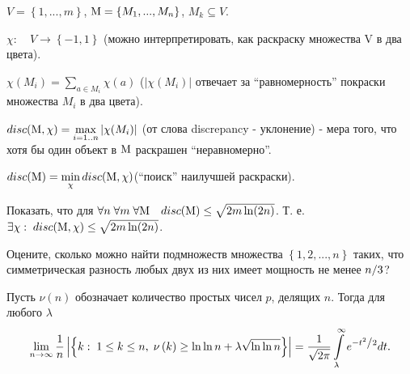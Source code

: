 \begin{problem}
$V=\left\{ {1,...,m} \right\}$, ${\rm M}=\left\{ {M_1 
,...,M_n } \right\}$, $M_k \subseteq V$.

$\chi :\quad V\to \left\{ {-1,1} \right\}$ (можно интерпретировать, как 
раскраску множества V в два цвета).

$\chi (M_i )=\sum\limits_{a\in M_i } {\chi (a)} $ ($\left| {\chi (M_i )} 
\right|$ отвечает за ``равномерность'' покраски множества $M_i $ в два 
цвета).

$disc({\rm M},\chi )=\mathop {\max }\limits_{i=1..n} \left| {\chi (M_i )} 
\right|$ (от слова discrepancy - уклонение) - мера того, что хотя бы один 
объект в ${\rm M}$ раскрашен ``неравномерно''.

$disc({\rm M})=\mathop {\min }\limits_\chi disc({\rm M},\chi )$(``поиск'' 
наилучшей раскраски).

Показать, что для $\forall n\;\forall m\;\forall {\rm M} \quad disc({\rm M})\le 
\sqrt {2m\ln (2n)} $. Т. е. $\exists \chi :\;disc({\rm M},\chi )\le \sqrt 
{2m\ln (2n)} $.

\end{problem}


\begin{problem}
Оцените, сколько можно найти подмножеств множества 
$\left\{ {1,2,...,n} \right\}$ таких, что симметрическая разность любых двух 
из них имеет мощность не менее $n \mathord{\left/ {\vphantom {n 3}} \right. 
\kern-\nulldelimiterspace} 3$?
\end{problem}



\begin{problem}
Пусть $\nu \left( n \right)$ 
обозначает количество простых чисел $p$, делящих $n$. Тогда для любого 
$\lambda $
\[
\mathop {\lim }\limits_{n\to \infty } \frac{1}{n}\left| {\left\{ {k:\;1\le 
k\le n,\;\nu \left( k \right)\ge \ln \ln n+\lambda \sqrt {\ln \ln n} } 
\right\}} \right|=\frac{1}{\sqrt {2\pi } }\int\limits_\lambda ^\infty 
{e^{-{t^2} \mathord{\left/ {\vphantom {{t^2} 2}} \right. 
\kern-\nulldelimiterspace} 2}dt} .
\]
\end{problem}



